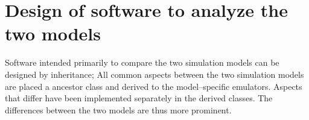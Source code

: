 
\section{Design of software to analyze the two models}
	\label{secDesignOfSoftwareToAnalyzeTheTwoModels}

	Software intended primarily to compare the two simulation models can be designed by inheritance; 
		All common aspects between the two simulation models are placed a ancestor class and derived to the model--specific emulators. %
	Aspects that differ have been implemented separately in the derived classes.
	The differences between the two models are thus more prominent.

	


